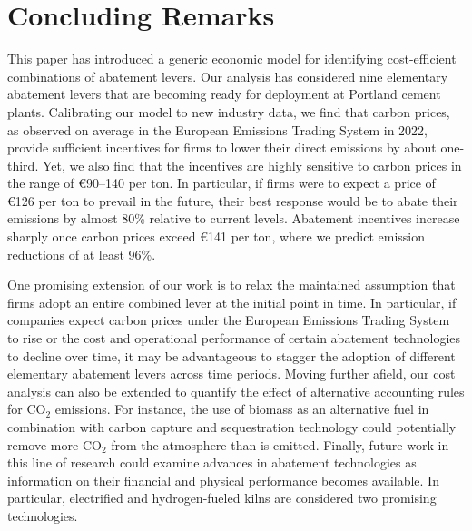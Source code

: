 \documentclass[12pt, a4paper]{article} %
\begin{document}
\section{Concluding Remarks}
\label{sec: conclusion}

This paper has introduced a generic economic model for identifying cost-efficient combinations of abatement levers. Our analysis has considered nine elementary abatement levers that are becoming ready for deployment at Portland cement plants. Calibrating our model to new industry data, we find that carbon prices, as observed on average in the European Emissions Trading System in 2022, provide sufficient incentives for firms to lower their direct emissions by about one-third. Yet, we also find that the incentives are highly sensitive to carbon prices in the range of \euro 90--140 per ton. In particular, if firms were to expect a price of \euro 126 per ton to prevail in the future, their best response would be to abate their emissions by almost 80\% relative to current levels. Abatement incentives increase sharply once carbon prices exceed \euro 141 per ton, where we predict emission reductions of at least 96\%.

One promising extension of our work is to relax the maintained assumption that firms adopt an entire combined lever at the initial point in time. In particular, if companies expect carbon prices under the European Emissions Trading System to rise or the cost and operational performance of certain abatement technologies to decline over time, it may be advantageous to stagger the adoption of different elementary abatement levers across time periods. Moving further afield, our cost analysis can also be extended to quantify the effect of alternative accounting rules for CO$_2$ emissions. For instance, the use of biomass as an alternative fuel in combination with carbon capture and sequestration technology could potentially remove more CO$_2$ from the atmosphere than is emitted. Finally, future work in this line of research could examine advances in abatement technologies as information on their financial and physical performance becomes available. In particular, electrified and hydrogen-fueled kilns are considered two promising technologies.


\end{document}
